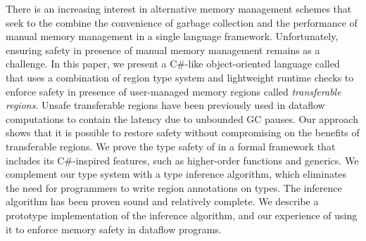 There is an increasing interest in alternative memory management
schemes that seek to the combine the convenience of garbage collection
and the performance of manual memory management in a single language
framework.  Unfortunately, ensuring safety in presence of manual
memory management remains as a challenge. In this paper, we present a
C\#-like object-oriented language called \name that uses a combination
of region type system and lightweight runtime checks to enforce safety
in presence of user-managed memory regions called \emph{transferable
regions}. Unsafe transferable regions have been previously used in
dataflow computations to contain the latency due to unbounded GC
pauses. Our approach shows that it is possible to restore safety
without compromising on the benefits of transferable regions. We prove
the type safety of \name in a formal framework that includes its
C\#-inspired features, such as higher-order functions and generics. We
complement our type system with a type inference algorithm, which
eliminates the need for programmers to write region annotations on
types. The inference algorithm has been proven sound and relatively
complete. We describe a prototype implementation of the inference
algorithm, and our experience of using it to enforce memory safety in
dataflow programs.

